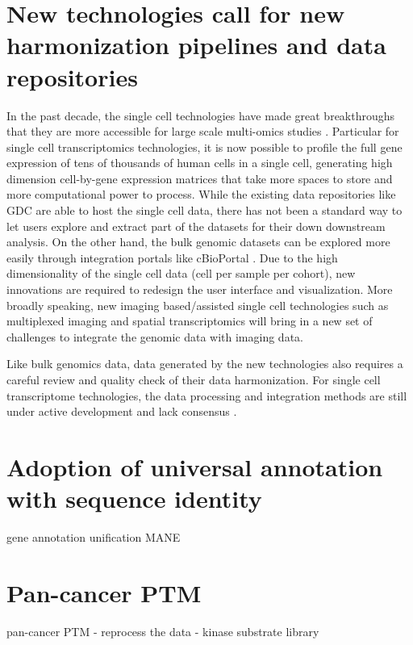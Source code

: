 \section{New technologies call for new harmonization pipelines and data repositories}
In the past decade, the single cell technologies have made great breakthroughs that they are more accessible for large scale multi-omics studies \cite{chappelll_voett:SingleCellMulti2018}. Particular for single cell transcriptomics technologies, it is now possible to profile the full gene expression of tens of thousands of human cells in a single cell, generating high dimension cell-by-gene expression matrices that take more spaces to store and more computational power to process. While the existing data repositories like GDC are able to host the single cell data, there has not been a standard way to let users explore and extract part of the datasets for their down downstream analysis. On the other hand, the bulk genomic datasets can be explored more easily through integration portals like cBioPortal \cite{ceramie_schultzn:CBioCancer2012,gaoj_schultzn:IntegrativeAnalysis2013}. Due to the high dimensionality of the single cell data (cell per sample per cohort), new innovations are required to redesign the user interface and visualization. More broadly speaking, new imaging based/assisted single cell technologies such as multiplexed imaging \cite{giesenc_bodenmillerb:HighlyMultiplexed2014,goltsevy_nolangp:DeepProfiling2018,tanwcc_limtkh:OverviewMultiplex2020} and spatial transcriptomics \cite{morrissa_morrissa:PinpointingSpatial2019,longosk_khavaripa:IntegratingSinglecell2021,driesr_yuangc:AdvancesSpatial2021} will bring in a new set of challenges to integrate the genomic data with imaging data.

Like bulk genomics data, data generated by the new technologies also requires a careful review and quality check of their data harmonization. For single cell transcriptome technologies, the data processing and integration methods are still under active development and lack consensus \cite{lahnemannd_schonhutha:ElevenGrand2020,andrewsts_hembergm:TutorialGuidelines2021}.



\section{Adoption of universal annotation with sequence identity}
gene annotation unification MANE


\section{Pan-cancer PTM}
pan-cancer PTM
- reprocess the data
- kinase substrate library


